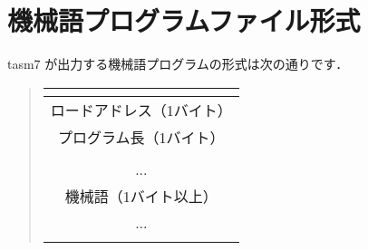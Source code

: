 %
%

\newpage
\section{機械語プログラムファイル形式}
\label{appB:fileformat}
tasm7 が出力する機械語プログラムの形式は次の通りです．

\begin{quote}
{\small\bf\begin{tabular}{|c|}
\multicolumn{1}{c}{}\\
\hline
ロードアドレス（1バイト） \\
\hline
プログラム長（1バイト） \\
\hline
\\
...\\
機械語（1バイト以上） \\
...\\
\\
\hline
\end{tabular}}
\end{quote}

